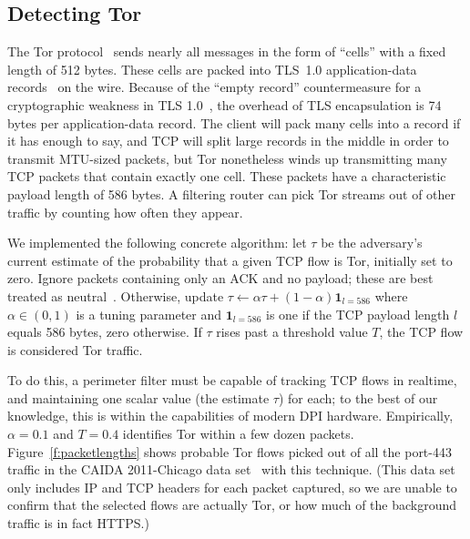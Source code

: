 \subsection{Detecting Tor}\label{s:detect-tor}

The Tor protocol~\cite{s-tor} sends nearly all messages in the form of
“cells” with a fixed length of 512 bytes.  These cells are packed into
TLS~1.0 application-data records~\cite{s-tls1} on the wire.  Because
of the “empty record” countermeasure for a cryptographic weakness in
TLS 1.0~\cite{a-ssl-cp1,a-ssl-cp2}, the overhead of TLS encapsulation
is 74 bytes per application-data record.  The client will pack many
cells into a record if it has enough to say, and TCP will split large
records in the middle in order to transmit MTU-sized packets, but Tor
nonetheless winds up transmitting many TCP packets that contain
exactly one cell.  These packets have a characteristic payload length
of 586 bytes.  A filtering router can pick Tor streams out of other
traffic by counting how often they appear.

We implemented the following concrete algorithm: let $\tau$ be the
adversary's current estimate of the probability that a given TCP flow
is Tor, initially set to zero.  Ignore packets containing only an ACK
and no payload; these are best treated as neutral~\cite{a-finger-onion}.
Otherwise, update
\(
\tau \leftarrow \alpha \tau + (1 - \alpha) \mathbf{1}_{l=586}
\)
where $\alpha \in (0,1)$ is a tuning parameter and
$\mathbf{1}_{l=586}$ is one if the TCP payload length $l$ equals 586
bytes, zero otherwise.  If $\tau$ rises past a threshold value $T$,
the TCP flow is considered Tor traffic.

To do this, a perimeter filter must be capable of tracking TCP flows
in realtime, and maintaining one scalar value (the estimate $\tau$)
for each; to the best of our knowledge, this is within the
capabilities of modern DPI hardware.  Empirically, $\alpha = 0.1$ and
$T = 0.4$ identifies Tor within a few dozen packets.
Figure~\ref{f:packetlengths} shows probable Tor flows picked out of
all the port-443 traffic in the CAIDA 2011-Chicago
data set~\cite{d-caida} with this technique.  (This data set only
includes IP and TCP headers for each packet captured, so we are unable
to confirm that the selected flows are actually Tor, or how much of
the background traffic is in fact HTTPS.)


